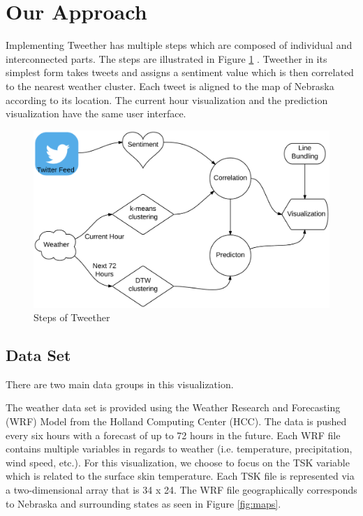 \documentclass[journal]{vgtc}                %
\begin{document}
\section{Our Approach}

Implementing Tweether has multiple steps which are composed of individual and interconnected parts. The steps are illustrated in Figure \ref{fig:steps} . Tweether in its simplest form takes tweets and assigns a sentiment value which is then correlated to the nearest weather cluster. Each tweet is aligned to the map of Nebraska according to its location. The current hour visualization and the prediction visualization have the same user interface.

\begin{figure}[htb]
 \centering
 \includegraphics[scale=0.1]{steps}
 \caption{Steps of Tweether}
 \label{fig:steps}
\end{figure}





\subsection{Data Set}

There are two main data groups in this visualization. 

The weather data set is provided using the Weather Research and Forecasting (WRF) Model from the Holland Computing Center (HCC). The data is pushed every six hours with a forecast of up to 72 hours in the future. Each WRF file contains multiple variables in regards to weather (i.e. temperature, precipitation, wind speed, etc.). For this visualization, we choose to focus on the TSK variable which is related to the surface skin temperature. Each TSK file is represented via a two-dimensional array that is 34 x 24. The WRF file geographically corresponds to Nebraska and surrounding states as seen in Figure \ref{fig:maps}.
\end{document}
